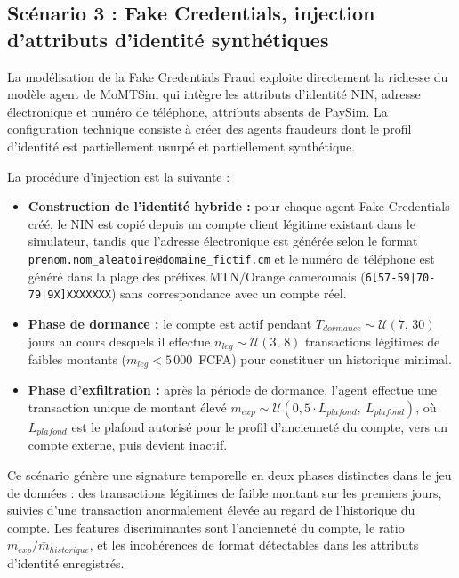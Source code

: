\documentclass[11pt,a4paper,oneside]{report}
\theoremstyle{definition}
\theoremstyle{remark}
\begin{document}
\subsection{Scénario 3 : Fake Credentials, injection d'attributs d'identité synthétiques}

La modélisation de la Fake Credentials Fraud exploite directement la richesse du modèle agent de MoMTSim qui intègre les attributs d'identité NIN, adresse électronique et numéro de téléphone, attributs absents de PaySim. La configuration technique consiste à créer des agents fraudeurs dont le profil d'identité est partiellement usurpé et partiellement synthétique.

La procédure d'injection est la suivante :

\begin{itemize}
    \item \textbf{Construction de l'identité hybride :} pour chaque agent Fake Credentials créé, le NIN est copié depuis un compte client légitime existant dans le simulateur, tandis que l'adresse électronique est générée selon le format \texttt{prenom.nom\_aleatoire@domaine\_fictif.cm} et le numéro de téléphone est généré dans la plage des préfixes MTN/Orange camerounais (\texttt{6[57-59|70-79|9X]XXXXXXX}) sans correspondance avec un compte réel.

    \item \textbf{Phase de dormance :} le compte est actif pendant $T_{dormance} \sim \mathcal{U}(7,\, 30)$ jours au cours desquels il effectue $n_{leg} \sim \mathcal{U}(3,\, 8)$ transactions légitimes de faibles montants ($m_{leg} < 5\,000$~FCFA) pour constituer un historique minimal.

    \item \textbf{Phase d'exfiltration :} après la période de dormance, l'agent effectue une transaction unique de montant élevé $m_{exp} \sim \mathcal{U}(0{,}5 \cdot L_{plafond},\ L_{plafond})$, où $L_{plafond}$ est le plafond autorisé pour le profil d'ancienneté du compte, vers un compte externe, puis devient inactif.
\end{itemize}

Ce scénario génère une signature temporelle en deux phases distinctes dans le jeu de données : des transactions légitimes de faible montant sur les premiers jours, suivies d'une transaction anormalement élevée au regard de l'historique du compte. Les features discriminantes sont l'ancienneté du compte, le ratio $m_{exp} / \bar{m}_{historique}$, et les incohérences de format détectables dans les attributs d'identité enregistrés.
\end{document}
